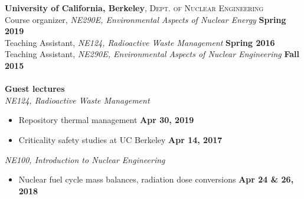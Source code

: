 \documentclass[margin,line]{resume}
\begin{document}
\begin{resume}
\textbf{University of California, Berkeley}, \textsc{Dept. of Nuclear Engineering}\\
Course organizer, \textsl{NE290E, Environmental Aspects of Nuclear Energy}
    \hfill \textbf{Spring 2019} \\
Teaching Assistant, \textsl{NE124, Radioactive Waste Management} 
    \hfill \textbf{Spring 2016} \\
Teaching Assistant, \textsl{NE290E, Environmental Aspects of Nuclear Engineering} \hfill \textbf{Fall 2015}\\
\vspace{0mm}\\
\textbf{Guest lectures} \\
\textsl{NE124, Radioactive Waste Management}
    \begin{itemize} %
        \item Repository thermal management \hfill \textbf{Apr 30, 2019}\vspace{-1mm}
        \item Criticality safety studies at UC Berkeley \hfill \textbf{Apr 14, 2017}
    \end{itemize} \vspace{-4mm}
\textsl{NE100, Introduction to Nuclear Engineering}
    \begin{itemize}
        \item Nuclear fuel cycle mass balances, radiation dose conversions \hfill \textbf{Apr 24 \& 26, 2018} \\
    \end{itemize}
% 


\end{resume}
\end{document}
